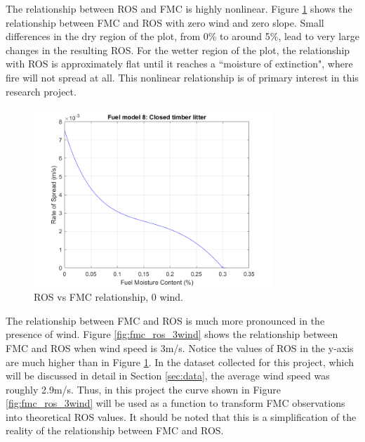 \documentclass[11pt]{article}%
\begin{document}
The relationship between ROS and FMC is highly nonlinear. Figure \ref{fig:fmc_ros_0wind} shows the relationship between FMC and ROS with zero wind and zero slope. Small differences in the dry region of the plot, from 0\% to around 5\%, lead to very large changes in the resulting ROS. For the wetter region of the plot, the relationship with ROS is approximately flat until it reaches a ``moisture of extinction", where fire will not spread at all. This nonlinear relationship is of primary interest in this research project. 

\begin{figure}[p]
    \centering
    \includegraphics[width=0.8\textwidth]{images/fuel8_ros_fm_0wind.png}
    \caption{ROS vs FMC relationship, 0 wind.}
    \label{fig:fmc_ros_0wind}
\end{figure}

The relationship between FMC and ROS is much more pronounced in the presence of wind. Figure \ref{fig:fmc_ros_3wind} shows the relationship between FMC and ROS when wind speed is 3m/s. Notice the values of ROS in the y-axis are much higher than in Figure \ref{fig:fmc_ros_0wind}. In the dataset collected for this project, which will be discussed in detail in Section \ref{sec:data}, the average wind speed was roughly 2.9m/s. Thus, in this project the curve shown in Figure \ref{fig:fmc_ros_3wind} will be used as a function to transform FMC observations into theoretical ROS values. It should be noted that this is a simplification of the reality of the relationship between FMC and ROS.
\end{document}
